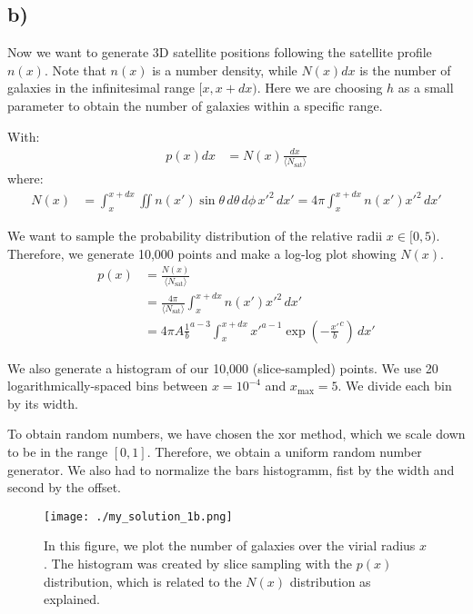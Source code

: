 \subsection*{b)}
Now we want to generate 3D satellite positions following the satellite profile \( n(x) \). Note that \( n(x) \) is a number density, while \( N(x)dx \) is the number of galaxies in the infinitesimal range \([x, x + dx)\). Here we are choosing \( h \) as a small parameter to obtain the number of galaxies within a specific range.

With:
\begin{align}
    p(x) dx &= N(x) \frac{dx}{\langle N_{\text{sat}} \rangle}
\end{align}
where:
\begin{align}
    N(x) &= \int_x^{x+dx} \iint n(x') \sin \theta \, d\theta \, d\phi \, x'^2 \, dx' = 4 \pi \int_x^{x+dx} n(x') x'^2 \, dx'
\end{align}

We want to sample the probability distribution of the relative radii \( x \in [0,5) \). Therefore, we generate 10,000 points and make a log-log plot showing \( N(x) \).
\begin{align}
    p(x) &= \frac{N(x)}{\langle N_{\text{sat}} \rangle}  \\
    &= \frac{4 \pi}{\langle N_{\text{sat}} \rangle} \int_x^{x+dx} n(x') x'^2 \, dx' \\
    &= 4 \pi A \frac{1}{b}^{a-3} \int_x^{x+dx} x'^{a-1} \exp\left(-\frac{x'}{b}^c\right) \, dx'
\end{align}

We also generate a histogram of our 10,000 (slice-sampled) points. We use 20 logarithmically-spaced bins between \( x = 10^{-4} \) and \(x_{\text{max}} = 5 \). We divide each bin by its width.

To obtain random numbers, we have chosen the xor method, which we scale down to be in the range \( [0,1] \). Therefore, we obtain a uniform random number generator. We also had to normalize the bars histogramm, fist by the width and second by the offset.

\begin{figure}
    \centering
    \texttt{[image: ./my\_solution\_1b.png]}
    \caption{In this figure, we plot the number of galaxies over the virial radius \( x \). The histogram was created by slice sampling with the \( p(x) \) distribution, which is related to the \( N(x) \) distribution as explained.}
    \label{fig:enter-label}
\end{figure}



